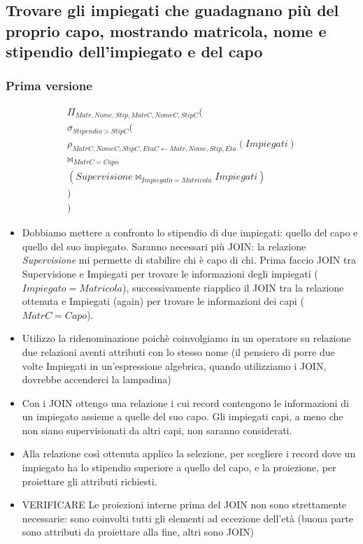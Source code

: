\subsection*{Trovare gli impiegati che guadagnano più del proprio capo, mostrando matricola, nome e stipendio dell'impiegato e del capo}
\subsubsection*{Prima versione}
\begin{align*}
	\Pi_{Matr,Nome,Stip,MatrC,NomeC,StipC} (\\
	\sigma_{Stipendio>StipC}(\\
	\rho_{MatrC,NomeC,StipC,EtaC \leftarrow Matr,Nome,Stip,Eta}(Impiegati)\\ \Join_{MatrC=Capo}\\(Supervisione \Join_{Impiegato=Matricola} Impiegati)
	\\)
	\\)
\end{align*}
\begin{itemize}
	\item Dobbiamo mettere a confronto lo stipendio di due impiegati: quello del capo e quello del suo impiegato. Saranno necessari più JOIN: la relazione \emph{Supervisione} mi permette di stabilire chi è capo di chi. Prima faccio JOIN tra Supervisione e Impiegati per trovare le informazioni degli impiegati ($Impiegato=Matricola$), successivamente riapplico il JOIN tra la relazione ottenuta e Impiegati (again) per trovare le informazioni dei capi ($MatrC = Capo$).
	\item Utilizzo la ridenominazione poichè coinvolgiamo in un operatore su relazione due relazioni aventi attributi con lo stesso nome (il pensiero di porre due volte Impiegati in un'espressione algebrica, quando utilizziamo i JOIN, dovrebbe accenderci la lampadina)
	\item Con i JOIN ottengo una relazione i cui record contengono le informazioni di un impiegato assieme a quelle del suo capo. Gli impiegati capi, a meno che non siano supervisionati da altri capi, non saranno considerati.
	\item Alla relazione così ottenuta applico la selezione, per scegliere i record dove un impiegato ha lo stipendio superiore a quello del capo, e la proiezione, per proiettare gli attributi richiesti.
	\item VERIFICARE Le proiezioni interne prima del JOIN non sono strettamente necessarie: sono coinvolti tutti gli elementi ad eccezione dell'età (buona parte sono attributi da proiettare alla fine, altri sono JOIN)
\end{itemize}
